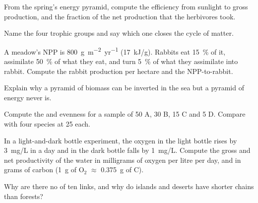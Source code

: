 \begin{exercise}[$\star$]\label{exo:b1:ecosystem-organization:3}
From the spring's energy pyramid, compute the efficiency from
sunlight to gross production, and the fraction of the net production
that the herbivores took.
\end{exercise}

\begin{exercise}[$\star$]\label{exo:b1:ecosystem-organization:4}
Name the four trophic groups and say which one closes the cycle of
matter.
\end{exercise}

\begin{exercise}[$\star\star$]\label{exo:b1:ecosystem-organization:5}
A meadow's NPP is \qty{800}{g.m^{-2}.yr^{-1}} (\qty{17}{kJ/g}).
Rabbits eat \qty{15}{\%} of it, assimilate \qty{50}{\%} of what they
eat, and turn \qty{5}{\%} of what they assimilate into rabbit. Compute
the rabbit production per hectare and the 
NPP-to-rabbit.
\end{exercise}

\begin{exercise}[$\star\star$]\label{exo:b1:ecosystem-organization:6}
Explain why a pyramid of biomass can be inverted in the sea but a
pyramid of energy never is.
\end{exercise}

\begin{exercise}[$\star\star$]\label{exo:b1:ecosystem-organization:7}
Compute the  and evenness for a sample of 50 A, 30 B, 15
C and 5 D. Compare with four species at 25 each.
\end{exercise}

\begin{exercise}[$\star\star$]\label{exo:b1:ecosystem-organization:8}
In a light-and-dark bottle experiment, the oxygen in the light bottle
rises by \qty{3}{mg/L} in a day and in the dark bottle falls by
\qty{1}{mg/L}. Compute the gross and net productivity of the water in
milligrams of oxygen per litre per day, and in grams of carbon
(\qty{1}{g} of $\mathrm{O_2}$ $\approx$ \qty{0.375}{g} of C).
\end{exercise}

\begin{exercise}[$\star\star$]\label{exo:b1:ecosystem-organization:9}
Why are there no  of ten links, and why do islands and
deserts have shorter chains than forests?
\end{exercise}

